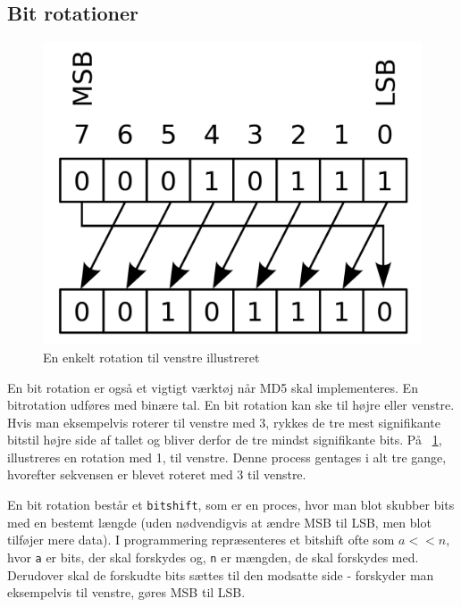 \documentclass[12pt]{article}
\begin{document}
\subsection{Bit rotationer}
\begin{figure}
\includegraphics[width=0.8\linewidth]{Rotate_left.png} 
\caption{En enkelt rotation til venstre illustreret \cite{wiki:circular}}
\label{fig:left-rotate-example}
\end{figure}

En bit rotation er også et vigtigt værktøj når MD5 skal implementeres. En bitrotation udføres med binære tal. En bit rotation kan ske til højre eller venstre. Hvis man eksempelvis roterer til venstre med 3, rykkes de tre mest signifikante bits\footnotemark[2] til højre side af tallet og bliver derfor de tre mindst signifikante bits. På \figurename{~\ref{fig:left-rotate-example}}, illustreres en rotation med 1, til venstre. Denne process gentages i alt tre gange, hvorefter sekvensen er blevet roteret med 3 til venstre. 


En bit rotation består et \verb|bitshift|, som er en proces, hvor man blot skubber bits med en bestemt længde (uden nødvendigvis at ændre MSB til LSB, men blot tilføjer mere data). I programmering repræsenteres et bitshift ofte \footnotemark[1] som \( a << n \), hvor \verb|a| er bits, der skal forskydes og, \verb|n| er mængden, de skal forskydes med.  Derudover skal de forskudte bits sættes til den modsatte side - forskyder man eksempelvis til venstre, gøres MSB til LSB. 


\end{document}
